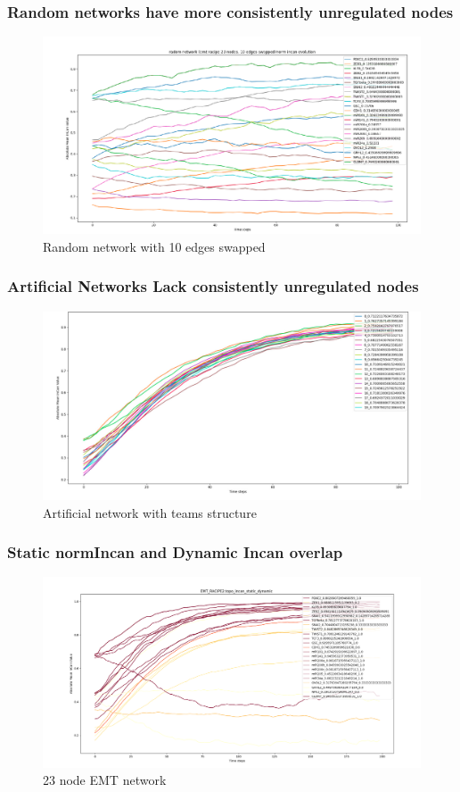 \documentclass[t]{beamer}
\begin{document}
\begin{frame}
\frametitle{Random networks have more consistently unregulated nodes}

\begin{figure}[H]
	\centering\includegraphics[scale=0.17]{img/randomnetworkemtracipeswap23.png}
	\caption{Random network with 10 edges swapped}
\end{figure}
\end{frame}


\begin{frame}
	\frametitle{Artificial Networks Lack consistently unregulated nodes}

\begin{figure}[H]
\centering 
\includegraphics[scale=0.12]{img/artificialnnetworkthreestateincann1.png}
\caption{Artificial network with teams structure }
\end{figure}

\end{frame}


\begin{frame}
	\frametitle{ Static normIncan and Dynamic Incan overlap  }

\begin{figure}[H]
\centering 
\includegraphics[scale=0.12]{img/static_dyincanemtracipe23.png}
\caption{23 node EMT network}
\end{figure}

\end{frame}
\end{document}
